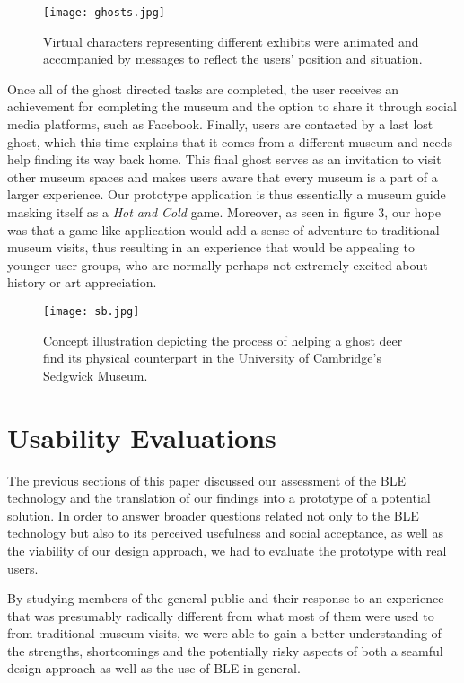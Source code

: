\documentclass[prodmode,acmtomm]{acmsmall}
\begin{document}
\begin{figure}[h!]
 \vspace{-10pt}
\begin{center}
\texttt{[image: ghosts.jpg]}
\caption{Virtual characters representing different exhibits were animated and accompanied by messages to reflect the users' position and situation.}
\end{center}
 \vspace{-15pt}
\end{figure}

Once all of the ghost directed tasks are completed, the user receives an achievement for completing the museum and the option to share it through social media platforms, such as Facebook. Finally, users are contacted by a last lost ghost, which this time explains that it comes from a different museum and needs help finding its way back home. This final ghost serves as an invitation to visit other museum spaces and makes users aware that every museum is a part of a larger experience. Our prototype application is thus essentially a museum guide masking itself as a \textit{Hot and Cold} game. Moreover, as seen in figure 3, our hope was that a game-like application would add a sense of adventure to traditional museum visits, thus resulting in an experience that would be appealing to younger user groups, who are normally perhaps not extremely excited about history or art appreciation. 

\begin{figure}[h!]
\begin{center}
\texttt{[image: sb.jpg]}
\caption{Concept illustration depicting the process of helping a ghost deer find its physical counterpart in the University of Cambridge's Sedgwick Museum.}
\end{center}
\end{figure}

\section{Usability Evaluations}
The previous sections of this paper discussed our assessment of the BLE technology and the translation of our findings into a prototype of a potential solution. In order to answer broader questions related not only to the BLE technology but also to its perceived usefulness and social acceptance, as well as the viability of our design approach, we had to evaluate the prototype with real users.

By studying members of the general public and their response to an experience that was presumably radically different from what most of them were used to from traditional museum visits, we were able to gain a better understanding of the strengths, shortcomings and the potentially risky aspects of both a seamful design approach as well as the use of BLE in general. 
\end{document}
